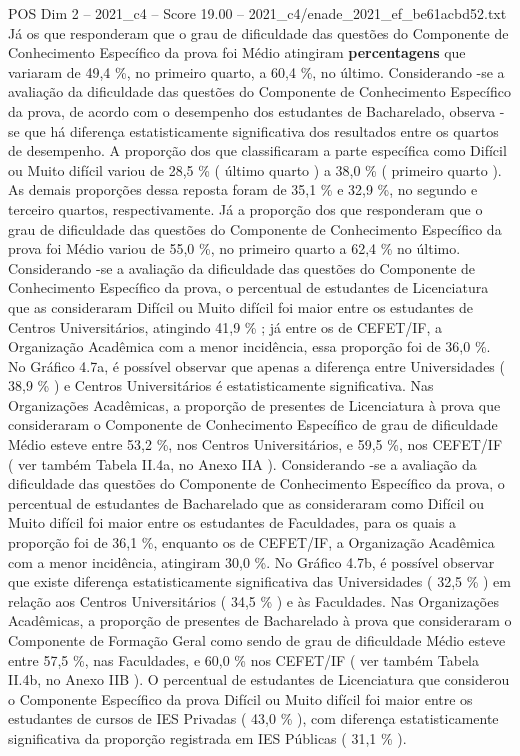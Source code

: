 \begin{textsample}{POS Dim 2 – 2021\_c4 – Score 19.00 – 2021\_c4/enade\_2021\_ef\_be61acbd52.txt}
Já os que responderam que o grau de dificuldade das questões do Componente de Conhecimento Específico da prova foi Médio atingiram \textbf{percentagens} que variaram de 49,4 \%, no primeiro quarto, a 60,4 \%, no último.
Considerando -se a avaliação da dificuldade das questões do Componente de Conhecimento Específico da prova, de acordo com o desempenho dos estudantes de Bacharelado, observa -se que há diferença estatisticamente significativa dos resultados entre os quartos de desempenho.
A proporção dos que classificaram a parte específica como Difícil ou Muito difícil variou de 28,5 \% ( último quarto ) a 38,0 \% ( primeiro quarto ).
As demais proporções dessa reposta foram de 35,1 \% e 32,9 \%, no segundo e terceiro quartos, respectivamente.
Já a proporção dos que responderam que o grau de dificuldade das questões do Componente de Conhecimento Específico da prova foi Médio variou de 55,0 \%, no primeiro quarto a 62,4 \% no último.
Considerando -se a avaliação da dificuldade das questões do Componente de Conhecimento Específico da prova, o percentual de estudantes de Licenciatura que as consideraram Difícil ou Muito difícil foi maior entre os estudantes de Centros Universitários, atingindo 41,9 \% ; já entre os de CEFET/IF, a Organização Acadêmica com a menor incidência, essa proporção foi de 36,0 \%.
No Gráfico 4.7a, é possível observar que apenas a diferença entre Universidades ( 38,9 \% ) e Centros Universitários é estatisticamente significativa.
Nas Organizações Acadêmicas, a proporção de presentes de Licenciatura à prova que consideraram o Componente de Conhecimento Específico de grau de dificuldade Médio esteve entre 53,2 \%, nos Centros Universitários, e 59,5 \%, nos CEFET/IF ( ver também Tabela II.4a, no Anexo IIA ).
Considerando -se a avaliação da dificuldade das questões do Componente de Conhecimento Específico da prova, o percentual de estudantes de Bacharelado que as consideraram como Difícil ou Muito difícil foi maior entre os estudantes de Faculdades, para os quais a proporção foi de 36,1 \%, enquanto os de CEFET/IF, a Organização Acadêmica com a menor incidência, atingiram 30,0 \%.
No Gráfico 4.7b, é possível observar que existe diferença estatisticamente significativa das Universidades ( 32,5 \% ) em relação aos Centros Universitários ( 34,5 \% ) e às Faculdades.
Nas Organizações Acadêmicas, a proporção de presentes de Bacharelado à prova que consideraram o Componente de Formação Geral como sendo de grau de dificuldade Médio esteve entre 57,5 \%, nas Faculdades, e 60,0 \% nos CEFET/IF ( ver também Tabela II.4b, no Anexo IIB ).
O percentual de estudantes de Licenciatura que considerou o Componente Específico da prova Difícil ou Muito difícil foi maior entre os estudantes de cursos de IES Privadas ( 43,0 \% ), com diferença estatisticamente significativa da proporção registrada em IES Públicas ( 31,1 \% ).

\end{textsample}
